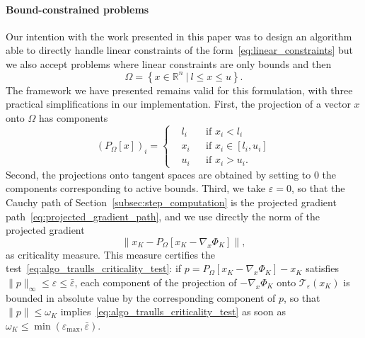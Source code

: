 \documentclass[pdflatex,sn-mathphys-num]{sn-jnl}%
\theoremstyle{thmstyleone}%
\newcommand{\RR}{{\mathbb{R}}} %
\newcommand{\calT}{{\mathcal{T}}}
\newcommand{\proj}[2]{P_{#1} \left[ {#2} \right]} %
\begin{document}
\paragraph*{Bound-constrained problems}
Our intention with the work presented in this paper was to design an algorithm able to directly handle linear constraints of the form~\eqref{eq:linear_constraints} but we also accept problems where linear constraints are only bounds and then
\[\Omega = \left\{x \in \RR^n \ |\ l \le x \le u\right\}.\]
The framework we have presented remains valid for this formulation, with three practical simplifications in our implementation. First, the projection of a vector $x$ onto $\Omega$ has components
\begin{equation}\label{eq:projection_bounds}
	\left(\proj{\Omega}{x}\right)_i = 
	\left\{ \begin{aligned}
		& l_i & &\text{if } x_i < l_i \\
		& x_i & &\text{if } x_i \in [l_i,u_i] \\
		& u_i & &\text{if } x_i > u_i.
	\end{aligned} \right.
\end{equation}
Second, the projections onto tangent spaces are obtained by setting to $0$ the components corresponding to active bounds. Third, we take $\varepsilon = 0$, so that the Cauchy path of Section~\ref{subsec:step_computation} is the projected gradient path~\eqref{eq:projected_gradient_path}, and we use directly the norm of the projected gradient
\[\left\| x_K - \proj{\Omega}{x_K-\nabla_x\Phi_K}\right\|,\]
as criticality measure. This measure certifies the test~\eqref{eq:algo_traulls_criticality_test}: if $p = \proj{\Omega}{x_K-\nabla_x\Phi_K} - x_K$ satisfies $\|p\|_\infty \le \varepsilon \le \bar\varepsilon$, each component of the projection of $-\nabla_x\Phi_K$ onto $\calT_\varepsilon(x_K)$ is bounded in absolute value by the corresponding component of $p$, so that $\|p\| \le \omega_K$ implies~\eqref{eq:algo_traulls_criticality_test} as soon as $\omega_K \le \min(\varepsilon_{\max},\bar\varepsilon)$.
\end{document}
